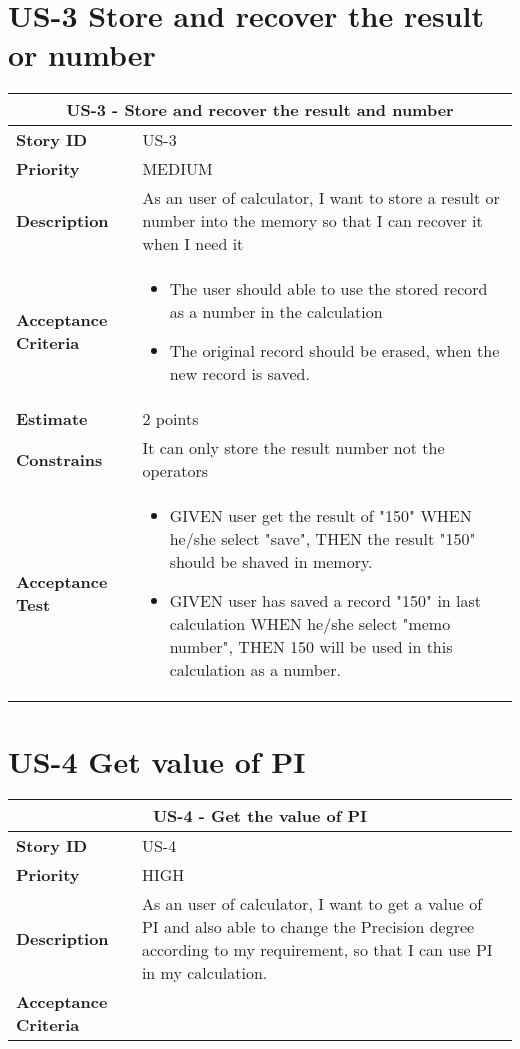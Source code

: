 \documentclass[12pt]{report}
\begin{document}
{\begin{tabular}{ |p{4cm}|p{11cm}| }
\end{tabular}


\section{US-3 Store and recover the result or number}
\begin{tabular}{ |p{4cm}|p{11cm}|  }
 \hline
 \multicolumn{2}{|c|}{US-3 - Store and recover the result and number } \\
 \hline
 \textbf {Story ID}& US-3 \\
 \hline
 \textbf{Priority} & MEDIUM \\
 \hline
  \textbf{Description}   & As an user of calculator, I want to  store a result or number into the memory so that I can recover it when I need it \\
 \hline
\textbf{Acceptance Criteria}&
   \begin{itemize}
     \item The user should able to use the stored record as a number in the calculation
     \item The original record should be erased, when the new record is saved. 
     \end{itemize}
\\
 \hline
 \textbf{Estimate} & 2 points\\
 \hline
 \textbf{Constrains}& It can only store the result number not the operators  \\
 \hline
 \textbf{Acceptance Test}&
   \begin{itemize}
     \item GIVEN user get the result of "150" WHEN he/she select "save", THEN the result "150" should be shaved in memory.
          \item GIVEN user has saved a record "150" in last calculation WHEN he/she select "memo number", THEN 150 will be used in this calculation as a number.


     \end{itemize}
\\
 \hline
\end{tabular}




\section{US-4 Get value of PI}
\begin{tabular}{ |p{4cm}|p{11cm}|  }
 \hline
 \multicolumn{2}{|c|}{US-4 - Get the value of PI} \\
 \hline
 \textbf {Story ID}& US-4  \\
 \hline
 \textbf{Priority} & HIGH \\
 \hline
 \textbf{Description}   & As an user of calculator, I want to get a value of PI and also able to change the Precision degree according to my requirement, so that I can use PI in my calculation. \\
 \hline
 \textbf{Acceptance Criteria}& 


\end{tabular}}
\end{document}

